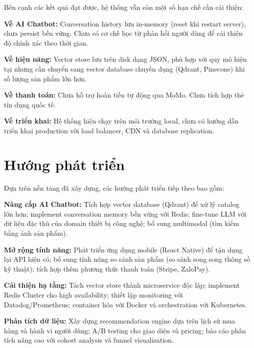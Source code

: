 Bên cạnh các kết quả đạt được, hệ thống vẫn còn một số hạn chế cần cải thiện:

\textbf{Về AI Chatbot:} Conversation history lưu in-memory (reset khi restart server), chưa persist bền vững. Chưa có cơ chế học từ phản hồi người dùng để cải thiện độ chính xác theo thời gian.

\textbf{Về hiệu năng:} Vector store lưu trên disk dạng JSON, phù hợp với quy mô hiện tại nhưng cần chuyển sang vector database chuyên dụng (Qdrant, Pinecone) khi số lượng sản phẩm lớn hơn.

\textbf{Về thanh toán:} Chưa hỗ trợ hoàn tiền tự động qua MoMo. Chưa tích hợp thẻ tín dụng quốc tế.

\textbf{Về triển khai:} Hệ thống hiện chạy trên môi trường local, chưa có hướng dẫn triển khai production với load balancer, CDN và database replication.

\section*{Hướng phát triển}

Dựa trên nền tảng đã xây dựng, các hướng phát triển tiếp theo bao gồm:

\textbf{Nâng cấp AI Chatbot:} Tích hợp vector database (Qdrant) để xử lý catalog lớn hơn; implement conversation memory bền vững với Redis; fine-tune LLM với dữ liệu đặc thù của domain thiết bị công nghệ; bổ sung multimodal (tìm kiếm bằng ảnh sản phẩm).

\textbf{Mở rộng tính năng:} Phát triển ứng dụng mobile (React Native) để tận dụng lại API hiện có; bổ sung tính năng so sánh sản phẩm (so sánh song song thông số kỹ thuật); tích hợp thêm phương thức thanh toán (Stripe, ZaloPay).

\textbf{Cải thiện hạ tầng:} Tách vector store thành microservice độc lập; implement Redis Cluster cho high availability; thiết lập monitoring với Datadog/Prometheus; container hóa với Docker và orchestration với Kubernetes.

\textbf{Phân tích dữ liệu:} Xây dựng recommendation engine dựa trên lịch sử mua hàng và hành vi người dùng; A/B testing cho giao diện và pricing; báo cáo phân tích nâng cao với cohort analysis và funnel visualization.
